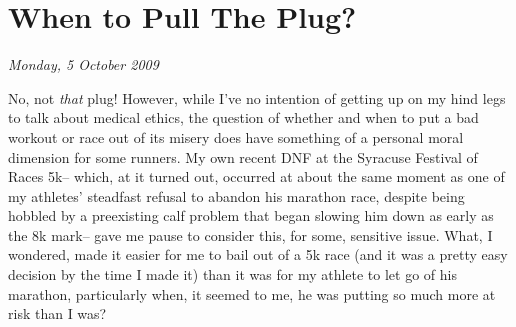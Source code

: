 \chapter{When to Pull The Plug?}
\textit{Monday, 5 October 2009}
\bigskip

No, not \textit{that} plug! However, while I've no intention of getting up on my hind legs to talk about medical ethics, the question of whether and when to put a bad workout or race out of its misery does have something of a personal moral dimension for some runners. My own recent DNF at the Syracuse Festival of Races 5k-- which, at it turned out, occurred at about the same moment as one of my athletes' steadfast refusal to abandon his marathon race, despite being hobbled by a preexisting calf problem that began slowing him down as early as the 8k mark-- gave me pause to consider this, for some, sensitive issue. What, I wondered, made it easier for me to bail out of a 5k race (and it was a pretty easy decision by the time I made it) than it was for my athlete to let go of his marathon, particularly when, it seemed to me, he was putting so much more at risk than I was?

